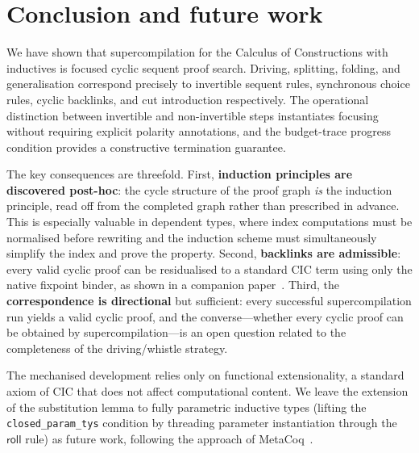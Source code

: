 \section{Conclusion and future work}
\label{sec:conclusion}

We have shown that supercompilation for the Calculus of Constructions with
inductives is focused cyclic sequent proof search.  Driving, splitting,
folding, and generalisation correspond precisely to invertible sequent
rules, synchronous choice rules, cyclic backlinks, and cut introduction
respectively.  The operational distinction between invertible and
non-invertible steps instantiates focusing without requiring explicit
polarity annotations, and the budget-trace progress condition provides a
constructive termination guarantee.

The key consequences are threefold.  First, \textbf{induction principles are
discovered post-hoc}: the cycle structure of the proof graph \emph{is} the
induction principle, read off from the completed graph rather than
prescribed in advance.  This is especially valuable in dependent types,
where index computations must be normalised before rewriting and the
induction scheme must simultaneously simplify the index and prove the
property.  Second, \textbf{backlinks are admissible}: every valid cyclic
proof can be residualised to a standard CIC term using only the native
fixpoint binder, as shown in a companion paper~\cite{admissibility-2027}.
Third, the \textbf{correspondence is directional} but sufficient: every
successful supercompilation run yields a valid cyclic proof, and the
converse---whether every cyclic proof can be obtained by supercompilation---is
an open question related to the completeness of the driving/whistle
strategy.

The mechanised development relies only on functional extensionality, a
standard axiom of CIC that does not affect computational content.  We
leave the extension of the substitution lemma to fully parametric
inductive types (lifting the \texttt{closed\_param\_tys} condition by
threading parameter instantiation through the $\mathsf{roll}$ rule) as
future work, following the approach of MetaCoq~\cite{sozeau-etal-2023-metacoq-jar}.
